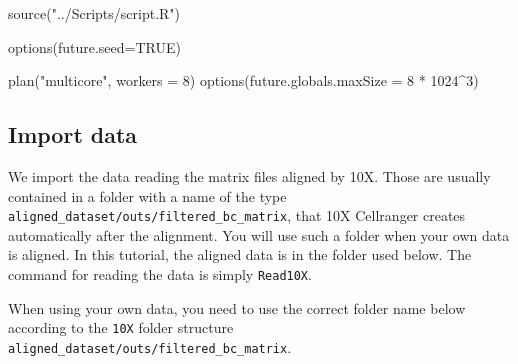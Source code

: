 \documentclass[
  letterpaper,
  DIV=11,
  numbers=noendperiod]{scrartcl}
\newenvironment{Shaded}{}{}
\newcommand{\AttributeTok}[1]{\textcolor[rgb]{0.49,0.56,0.16}{#1}}
\newcommand{\ConstantTok}[1]{\textcolor[rgb]{0.53,0.00,0.00}{#1}}
\newcommand{\DecValTok}[1]{\textcolor[rgb]{0.25,0.63,0.44}{#1}}
\newcommand{\FunctionTok}[1]{\textcolor[rgb]{0.02,0.16,0.49}{#1}}
\newcommand{\NormalTok}[1]{#1}
\newcommand{\SpecialCharTok}[1]{\textcolor[rgb]{0.25,0.44,0.63}{#1}}
\newcommand{\StringTok}[1]{\textcolor[rgb]{0.25,0.44,0.63}{#1}}
\begin{document}
\begin{Shaded}
\begin{Highlighting}[]
\FunctionTok{source}\NormalTok{(}\StringTok{"../Scripts/script.R"}\NormalTok{)}
\end{Highlighting}
\end{Shaded}

\begin{Shaded}
\begin{Highlighting}[]
\FunctionTok{options}\NormalTok{(}\AttributeTok{future.seed=}\ConstantTok{TRUE}\NormalTok{)}
\end{Highlighting}
\end{Shaded}

\begin{Shaded}
\begin{Highlighting}[]
\FunctionTok{plan}\NormalTok{(}\StringTok{"multicore"}\NormalTok{, }\AttributeTok{workers =} \DecValTok{8}\NormalTok{)}
\FunctionTok{options}\NormalTok{(}\AttributeTok{future.globals.maxSize =} \DecValTok{8} \SpecialCharTok{*} \DecValTok{1024}\SpecialCharTok{\^{}}\DecValTok{3}\NormalTok{)}
\end{Highlighting}
\end{Shaded}

\subsection{Import data}\label{import-data}

We import the data reading the matrix files aligned by 10X. Those are
usually contained in a folder with a name of the type
\texttt{aligned\_dataset/outs/filtered\_bc\_matrix}, that 10X Cellranger
creates automatically after the alignment. You will use such a folder
when your own data is aligned. In this tutorial, the aligned data is in
the folder used below. The command for reading the data is simply
\texttt{Read10X}.

\begin{tcolorbox}[enhanced jigsaw, arc=.35mm, opacityback=0, coltitle=black, toprule=.15mm, opacitybacktitle=0.6, titlerule=0mm, colbacktitle=quarto-callout-important-color!10!white, left=2mm, breakable, bottomtitle=1mm, title=\textcolor{quarto-callout-important-color}{\faExclamation}\hspace{0.5em}{Important}, toptitle=1mm, colframe=quarto-callout-important-color-frame, leftrule=.75mm, rightrule=.15mm, bottomrule=.15mm, colback=white]

When using your own data, you need to use the correct folder name below
according to the \texttt{10X} folder structure
\texttt{aligned\_dataset/outs/filtered\_bc\_matrix}.

\end{tcolorbox}
\end{document}
